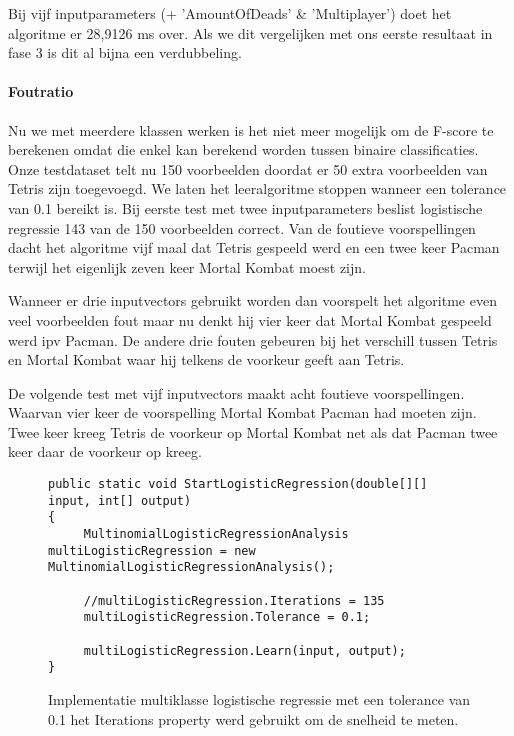 Bij vijf inputparameters (+ 'AmountOfDeads' \& 'Multiplayer') doet het algoritme er 28,9126 ms over. Als we dit vergelijken met ons eerste resultaat in fase 3 is dit al bijna een verdubbeling. 

\paragraph{Foutratio} 

Nu we met meerdere klassen werken is het niet meer mogelijk om de F-score te berekenen omdat die enkel kan berekend worden tussen binaire classificaties. Onze testdataset telt nu 150 voorbeelden doordat er 50 extra voorbeelden van Tetris zijn toegevoegd. We laten het leeralgoritme stoppen wanneer een tolerance van 0.1 bereikt is. Bij eerste test met twee inputparameters beslist logistische regressie 143 van de 150 voorbeelden correct. Van de foutieve voorspellingen dacht het algoritme vijf maal dat Tetris gespeeld werd en een twee keer Pacman terwijl het eigenlijk zeven keer Mortal Kombat moest zijn. 

Wanneer er drie inputvectors gebruikt worden dan voorspelt het algoritme even veel voorbeelden fout maar nu denkt hij vier keer dat Mortal Kombat gespeeld werd ipv Pacman. De andere drie fouten gebeuren bij het verschill tussen Tetris en Mortal Kombat waar hij telkens de voorkeur geeft aan Tetris.

De volgende test met vijf inputvectors maakt acht foutieve voorspellingen. Waarvan vier keer de voorspelling Mortal Kombat Pacman had moeten zijn. Twee keer kreeg Tetris de voorkeur op Mortal Kombat net als dat Pacman twee keer daar de voorkeur op kreeg.


\begin{figure}[]
	\renewcommand{\figurename}{Code}
\begin{lstlisting}
public static void StartLogisticRegression(double[][] input, int[] output)
{
     MultinomialLogisticRegressionAnalysis multiLogisticRegression = new MultinomialLogisticRegressionAnalysis();

	 //multiLogisticRegression.Iterations = 135
	 multiLogisticRegression.Tolerance = 0.1;

     multiLogisticRegression.Learn(input, output);
}

\end{lstlisting}
\caption{Implementatie multiklasse logistische regressie met een tolerance van 0.1 het Iterations property werd gebruikt om de snelheid te meten.}
\label{code:logistischeregressiefase3}
\end{figure}


